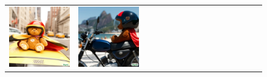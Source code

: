 \begin{figure}[ht!]
\begin{adjustwidth}{-0.8in}{-0.5in}
\begin{tabular}{cccccccccccccccccccc}
\multicolumn{3}{c}{\includegraphics[width=\twobytwocolwidth\textwidth]{figures/cherries/teddy_2.jpg}} &
\multicolumn{3}{c}{\includegraphics[width=\twobytwocolwidth\textwidth]{figures/cherries/teddy_3.jpg}} &&

\end{tabular}
\end{adjustwidth}
\end{figure}
